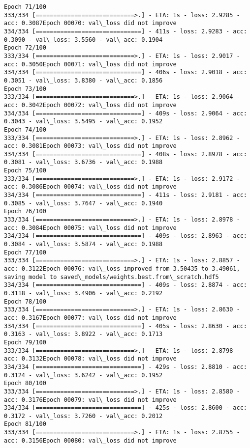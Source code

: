 \documentclass[11pt]{article}
\begin{document}
\begin{Verbatim}[commandchars=\\\{\}]
Epoch 71/100
333/334 [============================>.] - ETA: 1s - loss: 2.9285 - acc: 0.3087Epoch 00070: val\_loss did not improve
334/334 [==============================] - 411s - loss: 2.9283 - acc: 0.3090 - val\_loss: 3.5560 - val\_acc: 0.1904
Epoch 72/100
333/334 [============================>.] - ETA: 1s - loss: 2.9017 - acc: 0.3050Epoch 00071: val\_loss did not improve
334/334 [==============================] - 406s - loss: 2.9018 - acc: 0.3051 - val\_loss: 3.8380 - val\_acc: 0.1856
Epoch 73/100
333/334 [============================>.] - ETA: 1s - loss: 2.9064 - acc: 0.3042Epoch 00072: val\_loss did not improve
334/334 [==============================] - 409s - loss: 2.9064 - acc: 0.3043 - val\_loss: 3.5495 - val\_acc: 0.1952
Epoch 74/100
333/334 [============================>.] - ETA: 1s - loss: 2.8962 - acc: 0.3081Epoch 00073: val\_loss did not improve
334/334 [==============================] - 408s - loss: 2.8978 - acc: 0.3081 - val\_loss: 3.6736 - val\_acc: 0.1988
Epoch 75/100
333/334 [============================>.] - ETA: 1s - loss: 2.9172 - acc: 0.3086Epoch 00074: val\_loss did not improve
334/334 [==============================] - 411s - loss: 2.9181 - acc: 0.3085 - val\_loss: 3.7647 - val\_acc: 0.1940
Epoch 76/100
333/334 [============================>.] - ETA: 1s - loss: 2.8978 - acc: 0.3084Epoch 00075: val\_loss did not improve
334/334 [==============================] - 409s - loss: 2.8963 - acc: 0.3084 - val\_loss: 3.5874 - val\_acc: 0.1988
Epoch 77/100
333/334 [============================>.] - ETA: 1s - loss: 2.8857 - acc: 0.3122Epoch 00076: val\_loss improved from 3.50435 to 3.49061, saving model to saved\_models/weights.best.from\_scratch.hdf5
334/334 [==============================] - 409s - loss: 2.8874 - acc: 0.3118 - val\_loss: 3.4906 - val\_acc: 0.2192
Epoch 78/100
333/334 [============================>.] - ETA: 1s - loss: 2.8630 - acc: 0.3167Epoch 00077: val\_loss did not improve
334/334 [==============================] - 405s - loss: 2.8630 - acc: 0.3163 - val\_loss: 3.8922 - val\_acc: 0.1713
Epoch 79/100
333/334 [============================>.] - ETA: 1s - loss: 2.8798 - acc: 0.3132Epoch 00078: val\_loss did not improve
334/334 [==============================] - 429s - loss: 2.8810 - acc: 0.3124 - val\_loss: 3.6242 - val\_acc: 0.1952
Epoch 80/100
333/334 [============================>.] - ETA: 1s - loss: 2.8580 - acc: 0.3176Epoch 00079: val\_loss did not improve
334/334 [==============================] - 425s - loss: 2.8600 - acc: 0.3172 - val\_loss: 3.7260 - val\_acc: 0.2012
Epoch 81/100
333/334 [============================>.] - ETA: 1s - loss: 2.8755 - acc: 0.3156Epoch 00080: val\_loss did not improve

\end{Verbatim}
\end{document}
